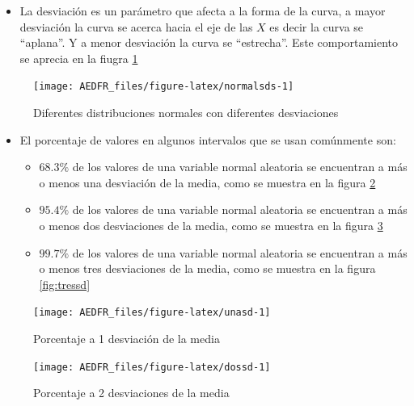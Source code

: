 \documentclass[letterpaper,]{book}
\providecommand{\tightlist}{%
  \setlength{\itemsep}{0pt}\setlength{\parskip}{0pt}}
\begin{document}
\begin{itemize}
\tightlist
\item
  La desviación es un parámetro que afecta a la forma de la curva, a mayor desviación la curva se acerca hacia el eje de las \(X\) es decir la curva se ``aplana''. Y a menor desviación la curva se ``estrecha''. Este comportamiento se aprecia en la fiugra \ref{fig:normalsds}
\end{itemize}

\begin{figure}[h!]

{\centering \texttt{[image: AEDFR\_files/figure-latex/normalsds-1]} 

}

\caption{Diferentes distribuciones normales con diferentes desviaciones}\label{fig:normalsds}
\end{figure}

\begin{itemize}
\tightlist
\item
  El porcentaje de valores en algunos intervalos que se usan comúnmente son:

  \begin{itemize}
  \tightlist
  \item
    \(68.3\%\) de los valores de una variable normal aleatoria se encuentran a más o menos una desviación de la media, como se muestra en la figura \ref{fig:unasd}
  \item
    \(95.4\%\) de los valores de una variable normal aleatoria se encuentran a más o menos dos desviaciones de la media, como se muestra en la figura \ref{fig:dossd}
  \item
    \(99.7\%\) de los valores de una variable normal aleatoria se encuentran a más o menos tres desviaciones de la media, como se muestra en la figura \ref{fig:tressd}
  \end{itemize}
\end{itemize}

\begin{figure}[h!]

{\centering \texttt{[image: AEDFR\_files/figure-latex/unasd-1]} 

}

\caption{Porcentaje a 1 desviación de la media}\label{fig:unasd}
\end{figure}

\begin{figure}[h!]

{\centering \texttt{[image: AEDFR\_files/figure-latex/dossd-1]} 

}

\caption{Porcentaje a 2 desviaciones de la media}\label{fig:dossd}
\end{figure}
\end{document}
